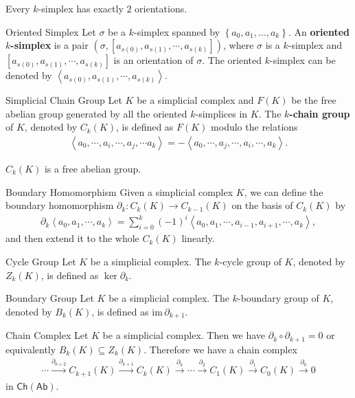 \documentclass{report}
\begin{document}
Every $k$-simplex has exactly $2$ orientations.
\begin{definition}{Oriented Simplex}{}
	Let $\sigma$ be a $k$-simplex spanned by $\left\{a_0, a_1, \ldots, a_k\right\}$. An \textbf{oriented $k$-simplex} is a pair $\left(\sigma, \left[a_{s(0)},a_{s(1)},\cdots,a_{s(k)}\right]\right)$, where $\sigma$ is a $k$-simplex and $\left[a_{s(0)},a_{s(1)},\cdots,a_{s(k)}\right]$ is an orientation of $\sigma$. The oriented $k$-simplex can be denoted by $\left\langle a_{s(0)},a_{s(1)},\cdots,a_{s(k)}\right\rangle$.
\end{definition}


\begin{definition}{Simplicial Chain Group}{}
	Let $K$ be a simplicial complex and $F(K)$ be the free abelian group generated by all the oriented $k$-simplices in $K$. The $k$\textbf{-chain group} of $K$, denoted by $C_k(K)$, is defined as $F(K)$ modulo the relations
	\begin{align*}
		\left\langle a_{0}, \cdots ,a_{i},\cdots,a_{j},\cdots a_{k}\right\rangle=-\left\langle a_{0},\cdots ,a_{j},\cdots,a_{i},\cdots,a_{k}\right\rangle.
	\end{align*}
\end{definition}

$C_k(K)$ is a free abelian group.
\begin{definition}{Boundary Homomorphism}{}
	Given a simplicial complex $K$, we can define the boundary homomorphism $\partial_k:C_k(K)\rightarrow C_{k-1}(K)$ on the basis of $C_k(K)$ by
	\begin{align*}
		\partial_k\left\langle a_{0},a_{1},\cdots,a_{k}\right\rangle=\sum_{i=0}^k(-1)^{i}\left\langle a_{0},a_{1},\cdots,a_{i-1},a_{i+1},\cdots,a_{k}\right\rangle,
	\end{align*}
	and then extend it to the whole $C_k(K)$ linearly.
\end{definition}


\begin{definition}{Cycle Group}{}
	Let $K$ be a simplicial complex. The $k$-cycle group of $K$, denoted by $Z_k(K)$,  is defined as $\ker\partial_k$.
\end{definition}


\begin{definition}{Boundary Group}{}
	Let $K$ be a simplicial complex. The $k$-boundary group of $K$, denoted by $B_k(K)$, is defined as $\mathrm{im}\,\partial_{k+1}$.
\end{definition}


\begin{proposition}{Chain Complex}{}
	Let $K$ be a simplicial complex. Then we have $\partial_k\circ\partial_{k+1}=0$ or equivalently $B_k(K)\subseteq Z_k(K)$. Therefore we have a chain complex 
	\begin{align*}
		\cdots\stackrel{\partial_{k+2}}{\longrightarrow}  C_{k+1}(K)\stackrel{\partial_{k+1}}{\longrightarrow} C_{k}(K)\stackrel{\partial_{k}}{\longrightarrow} \cdots\stackrel{\partial_{2}}{\longrightarrow}  C_1(K)\stackrel{\partial_{1}}{\longrightarrow} C_0(K)\stackrel{\partial_{0}}{\longrightarrow}  0
	\end{align*}
	in $\mathsf{Ch}(\mathsf{Ab})$. 
\end{proposition}
\end{document}
